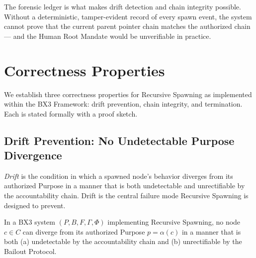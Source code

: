 The forensic ledger is what makes drift detection and chain integrity possible. Without a deterministic, tamper-evident record of every spawn event, the system cannot prove that the current parent pointer chain matches the authorized chain — and the Human Root Mandate would be unverifiable in practice.

\section{Correctness Properties}
\label{sec:correctness}

We establish three correctness properties for Recursive Spawning as implemented within the BX3 Framework: drift prevention, chain integrity, and termination. Each is stated formally with a proof sketch.

\subsection{Drift Prevention: No Undetectable Purpose Divergence}
\label{sec:drift-prevention}

\textit{Drift} is the condition in which a spawned node's behavior diverges from its authorized Purpose in a manner that is both undetectable and unrectifiable by the accountability chain. Drift is the central failure mode Recursive Spawning is designed to prevent.

\begin{thrm}
\label{thrm:drift-prevention}
In a BX3 system $(P, B, F, \Gamma, \Phi)$ implementing Recursive Spawning, no node $c \in C$ can diverge from its authorized Purpose $p = \alpha(c)$ in a manner that is both (a) undetectable by the accountability chain and (b) unrectifiable by the Bailout Protocol.
\end{thrm}

